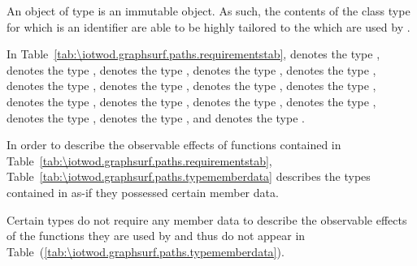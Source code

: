 \pnum
\begin{note}
An object of type  is an immutable object. As such, the contents of the class type for which  is an identifier are able to be highly tailored to the \underlyingrendandpresenttechs which are used by .
\end{note}

\pnum
In Table~\ref{tab:\iotwod.graphsurf.paths.requirementstab},  denotes the type ,  denotes the type ,  denotes the type ,  denotes the type ,  denotes the type ,  denotes the type ,  denotes the type ,  denotes the type ,  denotes the type ,  denotes the type ,  denotes the type ,  denotes the type ,  denotes the type ,  denotes the type ,  denotes the type , and  denotes the type .

\pnum
In order to describe the observable effects of functions contained in Table~\ref{tab:\iotwod.graphsurf.paths.requirementstab}, Table~\ref{tab:\iotwod.graphsurf.paths.typememberdata} describes the types contained in  as-if they possessed certain member data. 

\pnum
\begin{note}
Certain types do not require any member data to describe the observable effects of the functions they are used by and thus do not appear in Table~(\ref{tab:\iotwod.graphsurf.paths.typememberdata}).
\end{note}

